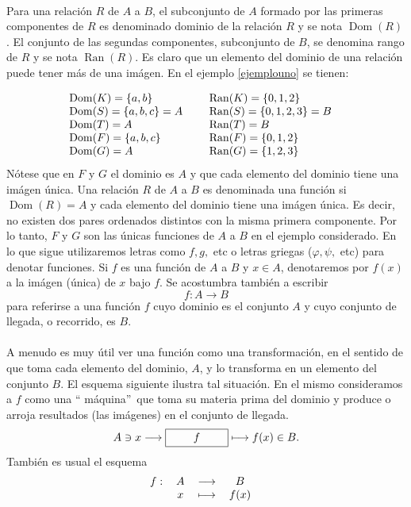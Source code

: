 \paragraph{}

Para una relaci\'{o}n $R$ de $A$ a $B$, el subconjunto de $A$ formado por las
primeras componentes de $R$ es denominado%
dominio de la relaci\'{o}n $R$ y se nota $\operatorname*{Dom}(R)$. El conjunto
de las segundas componentes, subconjunto de $B$, se denomina rango%
de $R$ y se nota $\operatorname*{Ran}(R)$. Es claro que un elemento del
dominio de una relaci\'{o}n puede tener m\'{a}s de una im\'{a}gen. En el
ejemplo \ref{ejemplouno} se tienen:%

\[%
\begin{tabular}
[c]{lll}%
$\operatorname*{Dom}(K)=\{a,b\}$ &  & $\operatorname*{Ran}(K)=\{0,1,2\}$\\
$\operatorname*{Dom}(S)=\{a,b,c\}=A$ &  & $\operatorname*{Ran}%
(S)=\{0,1,2,3\}=B$\\
$\operatorname*{Dom}(T)=A$ &  & $\operatorname*{Ran}(T)=B$\\
$\operatorname*{Dom}(F)=\{a,b,c\}$ &  & $\operatorname*{Ran}(F)=\{0,1,2\}$\\
$\operatorname*{Dom}(G)=A$ &  & $\operatorname*{Ran}(G)=\{1,2,3\}$%
\end{tabular}
\ \ \
\]
N\'{o}tese que en $F$ y $G$ el dominio es $A$ y que cada elemento del dominio
tiene una im\'{a}gen \'{u}nica. Una relaci\'{o}n $R$ de $A$ a $B$ es
denominada una%
funci\'{o}n si $\operatorname*{Dom}(R)=A$ y cada elemento del dominio tiene
una im\'{a}gen \'{u}nica. Es decir, no existen dos pares ordenados distintos
con la misma primera componente. Por lo tanto, $F$ y $G$ son las \'{u}nicas
funciones de $A$ a $B$ en el ejemplo conside\-rado. En lo que sigue
utilizaremos letras como $f,g,$ etc o letras griegas ($\varphi,\psi,$ etc)
para denotar funciones. Si $f$ es una funci\'{o}n de $A$ a $B$ y $x\in A$,
denotaremos por $f(x)$ a la
%
im\'{a}gen (\'{u}nica) de $x$ bajo $f$. Se acostumbra tambi\'{e}n a escribir
\[
f:A\longrightarrow B
\]
para referirse a una funci\'{o}n $f$ cuyo dominio es el conjunto $A$ y cuyo
conjunto de llegada, o recorrido, es $B$.

\paragraph{}

A menudo es muy \'{u}til ver una funci\'{o}n como una transformaci\'{o}n, en
el sentido de que toma cada elemento del dominio, $A$, y lo transforma en un
elemento del conjunto $B$. El esquema siguiente ilustra tal situaci\'{o}n. En
el mismo consideramos a $f$ como una \textquotedblleft
m\'{a}quina\textquotedblright\ que toma su materia prima del dominio y produce
o arroja resultados (las im\'{a}genes) en el conjunto de llegada.
\[
A\ni x\longrightarrow\framebox[2cm]{$f$}\longmapsto f(x)\in B.
\]
Tambi\'{e}n es usual el esquema
\[%
\begin{tabular}
[c]{cccc}%
$f:$ & $A$ & $\longrightarrow$ & $B$\\
& $x$ & $\longmapsto$ & $f(x)$%
\end{tabular}
\ \ \
\]


